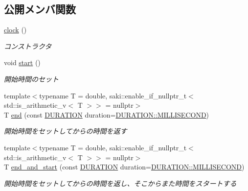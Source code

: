 \subsection*{公開メンバ関数}
\begin{DoxyCompactItemize}
\item 
\mbox{\hyperlink{classsaki_1_1clock_aec6aa6ad43fcc8f992f7ee9a25e25354}{clock}} ()
\begin{DoxyCompactList}\small\item\em コンストラクタ \end{DoxyCompactList}\item 
void \mbox{\hyperlink{classsaki_1_1clock_ad8c77a4865ba0a3840c640014887a0e3}{start}} ()
\begin{DoxyCompactList}\small\item\em 開始時間のセット \end{DoxyCompactList}\item 
{\footnotesize template$<$typename T  = double, saki\+::enable\+\_\+if\+\_\+nullptr\+\_\+t$<$ std\+::is\+\_\+arithmetic\+\_\+v$<$ T $>$$>$  = nullptr$>$ }\\T \mbox{\hyperlink{classsaki_1_1clock_af5f3f7501f70e5ece21c34a1ae88d642}{end}} (const \mbox{\hyperlink{classsaki_1_1clock_a33900ca0b3320bafb061928ad6827bdf}{D\+U\+R\+A\+T\+I\+ON}} duration=\mbox{\hyperlink{classsaki_1_1clock_a33900ca0b3320bafb061928ad6827bdfa241d7907de05ad50c011812e927cd671}{D\+U\+R\+A\+T\+I\+O\+N\+::\+M\+I\+L\+L\+I\+S\+E\+C\+O\+ND}})
\begin{DoxyCompactList}\small\item\em 開始時間をセットしてからの時間を返す \end{DoxyCompactList}\item 
{\footnotesize template$<$typename T  = double, saki\+::enable\+\_\+if\+\_\+nullptr\+\_\+t$<$ std\+::is\+\_\+arithmetic\+\_\+v$<$ T $>$$>$  = nullptr$>$ }\\T \mbox{\hyperlink{classsaki_1_1clock_a739c37a43defcf75d6fbabfb0b00f75e}{end\+\_\+and\+\_\+start}} (const \mbox{\hyperlink{classsaki_1_1clock_a33900ca0b3320bafb061928ad6827bdf}{D\+U\+R\+A\+T\+I\+ON}} duration=\mbox{\hyperlink{classsaki_1_1clock_a33900ca0b3320bafb061928ad6827bdfa241d7907de05ad50c011812e927cd671}{D\+U\+R\+A\+T\+I\+O\+N\+::\+M\+I\+L\+L\+I\+S\+E\+C\+O\+ND}})
\begin{DoxyCompactList}\small\item\em 開始時間をセットしてからの時間を返し、そこからまた時間をスタートする \end{DoxyCompactList}\end{DoxyCompactItemize}


